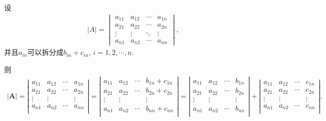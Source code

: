 \documentclass[../../main.tex]{subfiles}%
\begin{document}
\begin{proposition}\label{小拆分法}
设
\begin{align*}
|A| = 
\begin{vmatrix}
a_{11} & a_{12} & \cdots & a_{1n} \\
a_{21} & a_{22} & \cdots & a_{2n} \\
\vdots & \vdots & \ddots & \vdots \\
a_{n1} & a_{n2} & \cdots & a_{nn}
\end{vmatrix},
\nonumber
\end{align*}
并且$a_{in}$可以拆分成$b_{in}+c_{in}$,$\,\,i=1,2,\cdots,n.$

则
\begin{align*}
\left| \boldsymbol{A} \right|=\left| \begin{matrix}
a_{11}&		a_{12}&		\cdots&		a_{1n}\\
a_{21}&		a_{22}&		\cdots&		a_{2n}\\
\vdots&		\vdots&		&		\vdots\\
a_{n1}&		a_{n2}&		\cdots&		a_{nn}\\
\end{matrix} \right|=\left| \begin{matrix}
a_{11}&		a_{12}&		\cdots&		b_{1n}+c_{1n}\\
a_{21}&		a_{22}&		\cdots&		b_{2n}+c_{2n}\\
\vdots&		\vdots&		&		\vdots\\
a_{n1}&		a_{n2}&		\cdots&		b_{nn}+c_{nn}\\
\end{matrix} \right|=\left| \begin{matrix}
a_{11}&		a_{12}&		\cdots&		b_{1n}\\
a_{21}&		a_{22}&		\cdots&		b_{2n}\\
\vdots&		\vdots&		&		\vdots\\
a_{n1}&		a_{n2}&		\cdots&		b_{nn}\\
\end{matrix} \right|+\left| \begin{matrix}
a_{11}&		a_{12}&		\cdots&		c_{1n}\\
a_{21}&		a_{22}&		\cdots&		c_{2n}\\
\vdots&		\vdots&		&		\vdots\\
a_{n1}&		a_{n2}&		\cdots&		c_{nn}\\
\end{matrix} \right|.
\end{align*}
\end{proposition}
\end{document}
